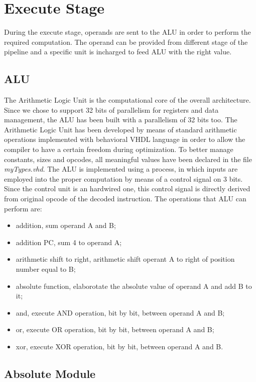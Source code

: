 \section{Execute Stage}

During the execute stage, operands are sent to the ALU in order to perform the required computation. 
The operand can be provided from different stage of the pipeline and a specific unit is incharged to feed ALU with the right value.

\subsection{ALU}

The Arithmetic Logic Unit is the computational core of the overall architecture.
Since we chose to support 32 bits of parallelism for registers and data management, the ALU has been built with a parallelism of 32 bits too.
The Arithmetic Logic Unit has been developed by means of standard arithmetic operations implemented with behavioral VHDL language in order to allow the compiler 
to have a certain freedom during optimization.
To better manage constants, sizes and opcodes, all meaningful values have been declared in the file \textit{myTypes.vhd}.
The ALU is implemented using a process, in which inputs are employed into the proper computation by means of a control signal on 3 bits.
Since the control unit is an hardwired one, this control signal is directly derived from original opcode of the decoded instruction.
The operations that ALU can perform are:
\begin{itemize}
    \item addition, sum operand A and B;
    \item addition PC, sum 4 to operand A;
    \item arithmetic shift to right, arithmetic shift operant A to right of position number equal to B;
    \item absolute function, elaborotate the absolute value of operand A and add B to it;
    \item and, execute AND operation, bit by bit, between operand A and B;
    \item or, execute OR operation, bit by bit, between operand A and B;
    \item xor, execute XOR operation, bit by bit, between operand A and B.
\end{itemize}
    

\subsection{Absolute Module}

